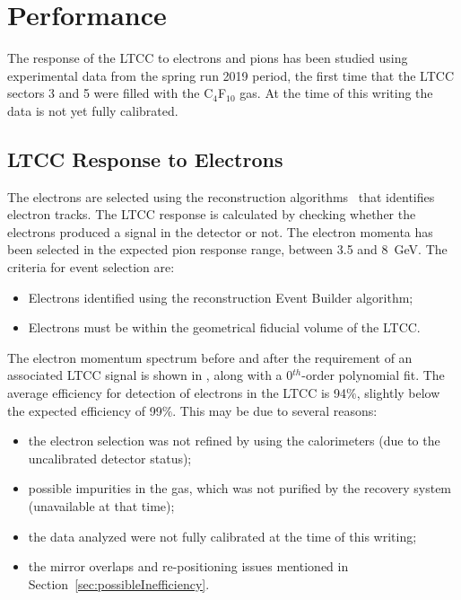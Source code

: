 \section{Performance}

The response of the LTCC to electrons and pions has been studied using experimental data from the spring run
2019 period, the first time that the LTCC sectors 3 and 5 were filled with the C$_4$F$_{10}$ gas. At the time
of this writing the data is not yet fully calibrated.

\subsection{LTCC Response to Electrons}
\label{sec:elecResponse}

The electrons are selected using the reconstruction algorithms~\cite{recon-nim} that identifies electron tracks. The
LTCC response is calculated by checking whether the electrons produced a signal in the detector or not. The electron
momenta has been selected in the expected pion response range, between 3.5 and 8~GeV. The criteria for event
selection are:

\begin{itemize}
\item  Electrons identified using the reconstruction Event Builder algorithm;
\item Electrons must be within the geometrical fiducial volume of the LTCC.
\end{itemize}


The electron momentum spectrum before and after the requirement of an associated LTCC signal is shown in
, along with a 0$^{th}$-order polynomial fit. The average efficiency for detection of
electrons in the LTCC is 94$\%$, slightly below the expected efficiency of 99$\%$. This may be due to
several reasons:

\begin{itemize}
\item the electron selection was not refined by using the calorimeters (due to the uncalibrated detector status);
\item possible impurities in the gas, which was not purified by the recovery system (unavailable at that time);
\item the data analyzed were not fully calibrated at the time of this writing;
\item the mirror overlaps and re-positioning issues mentioned in Section~\ref{sec:possibleInefficiency}.
\end{itemize}

